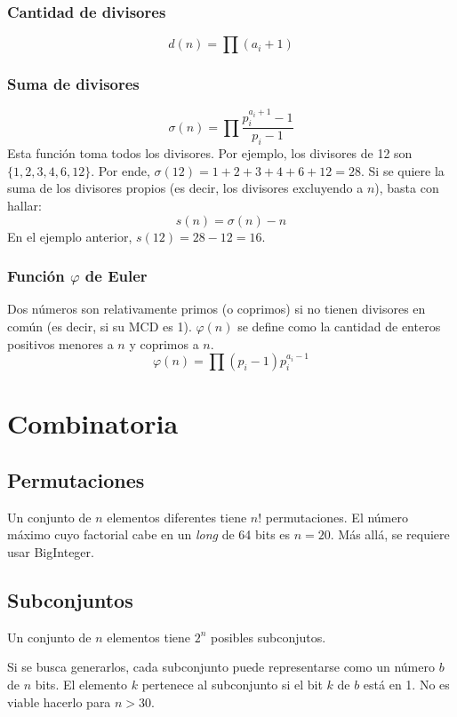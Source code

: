 \documentclass{article}
\begin{document}
\begin{multicols}{2}
		\subsubsection{Cantidad de divisores}
		\[ d(n) = \prod (a_{i} + 1) \]
		
		\subsubsection{Suma de divisores}
		\[ 
			\sigma (n) = \prod \frac{p_{i}^{a_{i} + 1} - 1}{p_{i} - 1}
		\]
		Esta función toma todos los divisores. Por ejemplo, los divisores de 12 son \( \{1, 2, 3, 4, 6, 12\} \). Por ende, \( \sigma(12) = 1+2+3+4+6+12 = 28 \). Si se quiere la suma de los divisores propios (es decir, los divisores excluyendo a \( n \)), basta con hallar:
		\[ 
			s (n) = \sigma (n) - n
		\]		
		En el ejemplo anterior, \( s (12) = 28-12 = 16 \).
		
		\subsubsection{Función $\varphi$ de Euler}
		Dos números son relativamente primos (o coprimos) si no tienen divisores en común (es decir, si su MCD es 1). \( \varphi (n) \) se define como la cantidad de enteros positivos menores a \( n \) y coprimos a \( n \). 
		\[ 
			\varphi (n) = \prod (p_{i} - 1) p_{i}^{a_{i}-1}
		\]

\section{Combinatoria}

	\subsection{Permutaciones}
	Un conjunto de \( n \) elementos diferentes tiene \( n! \) permutaciones. El número máximo cuyo factorial cabe en un \emph{long} de 64 bits es \( n = 20 \). Más allá, se requiere usar BigInteger.

\subsection{Subconjuntos}
	Un conjunto de \( n \) elementos tiene \( 2^{n} \) posibles subconjutos. 

	Si se busca generarlos, cada subconjunto puede representarse como un número \( b \) de \( n \) bits. El elemento \( k \) pertenece al subconjunto si el bit \( k \) de \( b \) está en 1. No es viable hacerlo para \( n > 30 \).
	


\end{multicols}
\end{document}

